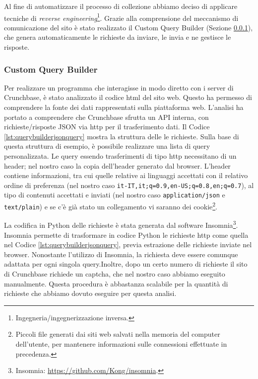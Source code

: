 Al fine di automatizzare il processo di collezione abbiamo deciso di applicare tecniche di \textit{reverse engineering}\footnote{Ingegneria/ingegnerizzazione inversa.}. 
Grazie alla comprensione del meccanismo di comunicazione del sito è stato realizzato il Custom Query Builder (Sezione \ref{customquerybuilder}), che genera automaticamente le richieste da inviare, le invia e ne gestisce le risposte.

\subsubsection{Custom Query Builder}
\label{customquerybuilder}
Per realizzare un programma che interagisse in modo diretto con i server di Crunchbase, è stato analizzato il codice html del sito web. Questo ha permesso di comprendere la fonte dei dati rappresentati sulla piattaforma web. L'analisi ha portato a comprendere che Crunchbase sfrutta un API interna, con richieste/risposte JSON via http per il trasferimento dati.
Il Codice \ref{lst:querybuilderjsonquery} mostra la struttura delle le richieste. 
Sulla base di questa struttura di esempio, è possibile realizzare una lista di query personalizzata. 
Le query essendo trasferimenti di tipo http necessitano di un header; nel nostro caso la copia dell'header generato dal browser.
L'header contiene informazioni, tra cui quelle relative ai linguaggi accettati con il relativo ordine di preferenza (nel nostro caso \texttt{it-IT,it;q=0.9,en-US;q=0.8,en;q=0.7}), al tipo di contenuti accettati e inviati (nel nostro caso \texttt{application/json} e \texttt{text/plain}) e se c'è già stato un collegamento vi saranno dei cookie\footnote{Piccoli file generati dai siti web salvati nella memoria del computer dell'utente, per mantenere informazioni sulle connessioni 
effettuate in precedenza.}. 

La codifica in Python delle richieste è stata generata dal software Insomnia\footnote{Insomnia: \url{https://github.com/Kong/insomnia}.}.
Insomnia permette di trasformare in codice Python le richieste http come quella nel Codice \ref{lst:querybuilderjsonquery}, previa estrazione delle richieste inviate nel browser. 
Nonostante l'utilizzo di Insomnia, la richiesta deve essere comunque adattata per ogni singola query.Inoltre, dopo un certo numero di richieste il sito di Crunchbase richiede un captcha, che nel nostro caso abbiamo eseguito manualmente. Questa procedura è abbastanza scalabile per la quantità di richieste che abbiamo dovuto eseguire per questa analisi.


